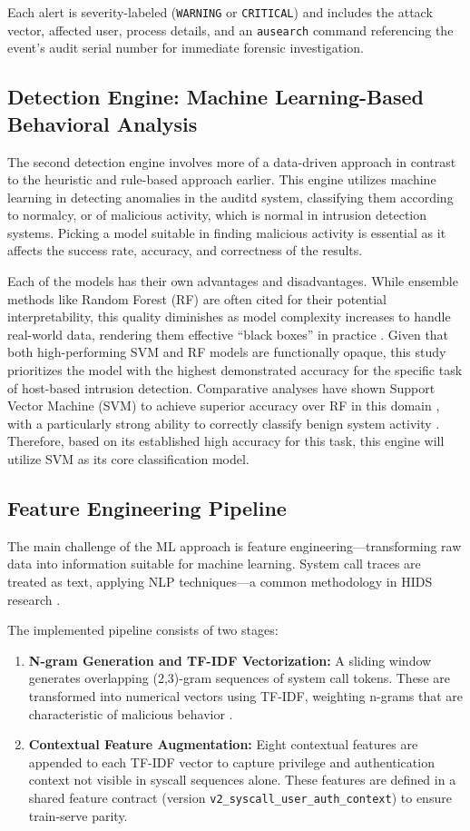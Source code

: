 \documentclass[journal]{./IEEEtran}
\begin{document}
Each alert is severity-labeled (\texttt{WARNING} or \texttt{CRITICAL}) and includes the attack vector, affected user, process details, and an \texttt{ausearch} command referencing the event's audit serial number for immediate forensic investigation.
\subsection{Detection Engine: Machine Learning-Based Behavioral Analysis}
The second detection engine involves more of a data-driven approach in contrast to the heuristic and rule-based approach earlier. This engine utilizes machine learning in detecting anomalies in the auditd system, classifying them according to normalcy, or of malicious activity, which is normal in intrusion detection systems. Picking a model suitable in finding malicious activity is essential as it affects the success rate, accuracy, and correctness of the results. 

Each of the models has their own advantages and disadvantages. While ensemble methods like Random Forest (RF) are often cited for their potential interpretability, this quality diminishes as model complexity increases to handle real-world data, rendering them effective ``black boxes'' in practice \cite{pereira2018}. Given that both high-performing SVM and RF models are functionally opaque, this study prioritizes the model with the highest demonstrated accuracy for the specific task of host-based intrusion detection. Comparative analyses have shown Support Vector Machine (SVM) to achieve superior accuracy over RF in this domain \cite{kumar2023}, with a particularly strong ability to correctly classify benign system activity \cite{shin2020}. Therefore, based on its established high accuracy for this task, this engine will utilize SVM as its core classification model.

\subsection{Feature Engineering Pipeline}\label{sec:feature-pipeline}
The main challenge of the ML approach is feature engineering---transforming raw data into information suitable for machine learning. System call traces are treated as text, applying NLP techniques---a common methodology in HIDS research \cite{zhang2020, khandelwal2022}.

The implemented pipeline consists of two stages:
\begin{enumerate}
    \item \textbf{N-gram Generation and TF-IDF Vectorization:} A sliding window generates overlapping (2,3)-gram sequences of system call tokens. These are transformed into numerical vectors using TF-IDF, weighting n-grams that are characteristic of malicious behavior \cite{zhang2020}.
    \item \textbf{Contextual Feature Augmentation:} Eight contextual features are appended to each TF-IDF vector to capture privilege and authentication context not visible in syscall sequences alone. These features are defined in a shared feature contract (version \texttt{v2\_syscall\_user\_auth\_context}) to ensure train-serve parity.
\end{enumerate}
\end{document}
